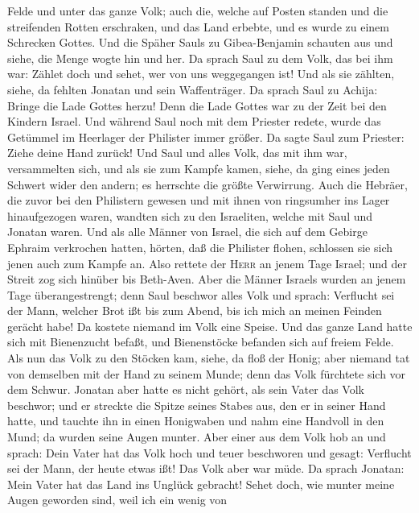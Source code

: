 Felde und unter das ganze Volk; auch die, welche auf Posten standen und
die streifenden Rotten erschraken, und das Land erbebte, und es wurde zu
einem Schrecken Gottes.  Und die Späher Sauls zu
Gibea-Benjamin schauten aus und siehe, die Menge wogte hin und her.
 Da sprach Saul zu dem Volk, das bei ihm war: Zählet doch
und sehet, wer von uns weggegangen ist! Und als sie zählten, siehe, da
fehlten Jonatan und sein Waffenträger.  Da sprach Saul zu
Achija: Bringe die Lade Gottes herzu! Denn die Lade Gottes war zu der
Zeit bei den Kindern Israel.  Und während Saul noch mit
dem Priester redete, wurde das Getümmel im Heerlager der Philister immer
größer. Da sagte Saul zum Priester: Ziehe deine Hand zurück!
 Und Saul und alles Volk, das mit ihm war, versammelten
sich, und als sie zum Kampfe kamen, siehe, da ging eines jeden Schwert
wider den andern; es herrschte die größte Verwirrung. 
Auch die Hebräer, die zuvor bei den Philistern gewesen und mit ihnen von
ringsumher ins Lager hinaufgezogen waren, wandten sich zu den
Israeliten, welche mit Saul und Jonatan waren.  Und als
alle Männer von Israel, die sich auf dem Gebirge Ephraim verkrochen
hatten, hörten, daß die Philister flohen, schlossen sie sich jenen auch
zum Kampfe an.  Also rettete der \textsc{Herr} an jenem
Tage Israel; und der Streit zog sich hinüber bis Beth-Aven.
 Aber die Männer Israels wurden an jenem Tage
überangestrengt; denn Saul beschwor alles Volk und sprach: Verflucht sei
der Mann, welcher Brot ißt bis zum Abend, bis ich mich an meinen Feinden
gerächt habe! Da kostete niemand im Volk eine Speise. 
Und das ganze Land hatte sich mit Bienenzucht befaßt, und Bienenstöcke
befanden sich auf freiem Felde.  Als nun das Volk zu den
Stöcken kam, siehe, da floß der Honig; aber niemand tat von demselben
mit der Hand zu seinem Munde; denn das Volk fürchtete sich vor dem
Schwur.  Jonatan aber hatte es nicht gehört, als sein
Vater das Volk beschwor; und er streckte die Spitze seines Stabes aus,
den er in seiner Hand hatte, und tauchte ihn in einen Honigwaben und
nahm eine Handvoll in den Mund; da wurden seine Augen munter.
 Aber einer aus dem Volk hob an und sprach: Dein Vater
hat das Volk hoch und teuer beschworen und gesagt: Verflucht sei der
Mann, der heute etwas ißt! Das Volk aber war müde.  Da
sprach Jonatan: Mein Vater hat das Land ins Unglück gebracht! Sehet
doch, wie munter meine Augen geworden sind, weil ich ein wenig von
